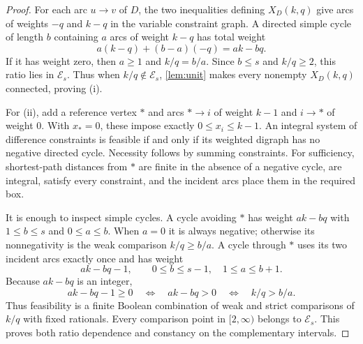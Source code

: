 \documentclass[11pt,a4paper]{article}
\theoremstyle{plain}
\theoremstyle{definition}
\theoremstyle{remark}
\newcommand{\cE}{\mathcal E}
\begin{document}
\label{pf:feasible}
\lemfeasible*
\begin{proof}
For each arc $u\to v$ of $D$, the two inequalities defining $X_D(k,q)$ give arcs of
weights $-q$ and $k-q$ in the variable constraint graph.  A directed simple cycle of
length $b$ containing $a$ arcs of weight $k-q$ has total weight
\[
 a(k-q)+(b-a)(-q)=ak-bq.
\]
If it has weight zero, then $a\ge1$ and $k/q=b/a$.  Since $b\le s$ and $k/q\ge2$,
this ratio lies in $\cE_s$.  Thus when $k/q\notin\cE_s$, \cref{lem:unit} makes every
nonempty $X_D(k,q)$ connected, proving (i).

For (ii), add a reference vertex $*$ and arcs $*\to i$ of weight $k-1$ and
$i\to *$ of weight $0$.  With $x_*=0$, these impose exactly $0\le x_i\le k-1$.
An integral system of difference constraints is feasible if and only if its weighted
digraph has no negative directed cycle.  Necessity follows by summing constraints.
For sufficiency, shortest-path distances from $*$ are finite in the absence of a
negative cycle, are integral, satisfy every constraint, and the incident arcs place
them in the required box.

It is enough to inspect simple cycles.  A cycle avoiding $*$ has weight $ak-bq$ with
$1\le b\le s$ and $0\le a\le b$.  When $a=0$ it is always negative; otherwise its
nonnegativity is the weak comparison $k/q\ge b/a$.  A cycle through $*$ uses its two
incident arcs exactly once and has weight
\[
 ak-bq-1,
 \qquad0\le b\le s-1,\quad1\le a\le b+1.
\]
Because $ak-bq$ is an integer,
\[
 ak-bq-1\ge0\quad\Longleftrightarrow\quad ak-bq>0
 \quad\Longleftrightarrow\quad k/q>b/a.
\]
Thus feasibility is a finite Boolean combination of weak and strict comparisons of
$k/q$ with fixed rationals.  Every comparison point in $[2,\infty)$ belongs to
$\cE_s$.  This proves both ratio dependence and constancy on the complementary
intervals.
\end{proof}
\end{document}
